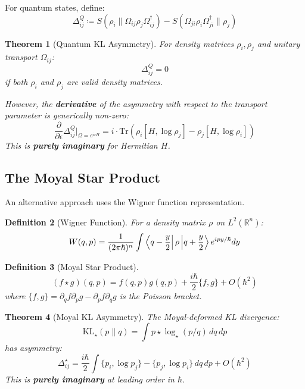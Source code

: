 \documentclass[11pt,a4paper]{article}
\newtheorem{theorem}{Theorem}[section]
\newtheorem{definition}[theorem]{Definition}
\newcommand{\KL}{\mathrm{KL}}
\newcommand{\Tr}{\mathrm{Tr}}
\newcommand{\R}{\mathbb{R}}
\begin{document}
For quantum states, define:
\begin{equation}
    \Delta_{ij}^Q \coloneqq S(\rho_i \| \Omega_{ij} \rho_j \Omega_{ij}^\dagger) - S(\Omega_{ji} \rho_i \Omega_{ji}^\dagger \| \rho_j)
\end{equation}

\begin{theorem}[Quantum KL Asymmetry]
For density matrices $\rho_i, \rho_j$ and unitary transport $\Omega_{ij}$:
\begin{equation}
    \Delta_{ij}^Q = 0
\end{equation}
\emph{if both $\rho_i$ and $\rho_j$ are valid density matrices.}

However, the \textbf{derivative} of the asymmetry with respect to the transport parameter is generically non-zero:
\begin{equation}
    \frac{\partial}{\partial \epsilon} \Delta_{ij}^Q\Big|_{\Omega = e^{i\epsilon H}} = i \cdot \Tr\left(\rho_i [H, \log\rho_j] - \rho_j [H, \log\rho_i]\right)
\end{equation}
This is \textbf{purely imaginary} for Hermitian $H$.
\end{theorem}

\subsection{The Moyal Star Product}

An alternative approach uses the Wigner function representation.

\begin{definition}[Wigner Function]
For a density matrix $\rho$ on $L^2(\R^n)$:
\begin{equation}
    W(q, p) = \frac{1}{(2\pi\hbar)^n} \int \bra{q - \frac{y}{2}} \rho \ket{q + \frac{y}{2}} e^{ipy/\hbar} dy
\end{equation}
\end{definition}

\begin{definition}[Moyal Star Product]
\begin{equation}
    (f \star g)(q, p) = f(q, p) g(q, p) + \frac{i\hbar}{2}\{f, g\} + O(\hbar^2)
\end{equation}
where $\{f, g\} = \partial_q f \partial_p g - \partial_p f \partial_q g$ is the Poisson bracket.
\end{definition}

\begin{theorem}[Moyal KL Asymmetry]
The Moyal-deformed KL divergence:
\begin{equation}
    \KL_\star(p \| q) = \int p \star \log_\star(p / q) \, dq \, dp
\end{equation}
has asymmetry:
\begin{equation}
    \Delta_{ij}^{\star} = \frac{i\hbar}{2} \int \{p_i, \log p_j\} - \{p_j, \log p_i\} \, dq \, dp + O(\hbar^2)
\end{equation}
This is \textbf{purely imaginary} at leading order in $\hbar$.
\end{theorem}
\end{document}
